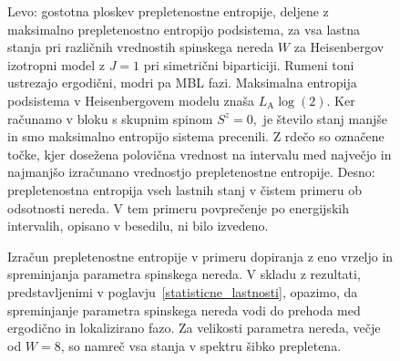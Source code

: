  \begin{figure}[H]
\caption{Levo: gostotna ploskev prepletenostne entropije, deljene z maksimalno prepletenostno entropijo podsistema, za vsa lastna stanja pri različnih vrednostih spinskega nereda $W$ za Heisenbergov izotropni model z $J=1$ pri simetrični biparticiji. Rumeni toni ustrezajo ergodični, modri pa MBL fazi. Maksimalna entropija podsistema v Heisenbergovem modelu znaša $L_\mathrm{A}\log(2).$ Ker računamo v bloku s skupnim spinom $S^z=0,$ je število stanj manjše in smo maksimalno entropijo sistema precenili. Z rdečo so označene točke, kjer dosežena polovična vrednost na intervalu med največjo in najmanjšo izračunano vrednostjo prepletenostne entropije. Desno: prepletenostna entropija vseh lastnih stanj v čistem primeru ob odsotnosti nereda. V tem primeru povprečenje po energijskih intervalih, opisano v besedilu, ni bilo izvedeno.    }
\label{fig:W_ent_entro_density_14_7_0}
\end{figure} 

 \begin{figure}[H]
\caption{Izračun prepletenostne entropije v primeru dopiranja z eno vrzeljo in spreminjanja parametra spinskega nereda. V skladu z rezultati, predstavljenimi v poglavju~\ref{statisticne_lastnosti}, opazimo, da spreminjanje parametra spinskega nereda vodi do prehoda med ergodično in lokalizirano fazo. Za velikosti parametra nereda, večje od $W=8$, so namreč vsa stanja v spektru šibko prepletena. }
\label{fig:W_ent_entro_density_11_5_1}
\end{figure} 

